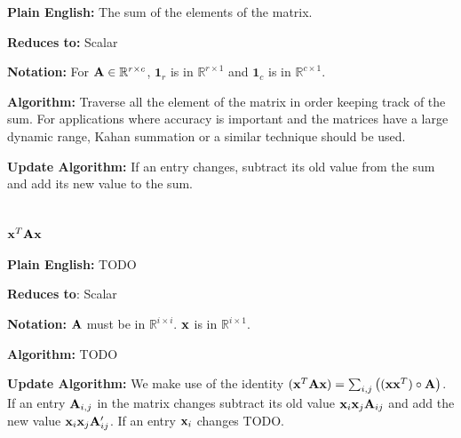 \textbf{Plain English:} The sum of the elements of the matrix.

\textbf{Reduces to:} Scalar

\textbf{Notation:} For $\mathbf{A} \in \mathbb{R}^{r\times c}$, $\mathbf{1}_r$ is in $\mathbb{R}^{r \times 1}$ and $\mathbf{1}_c$ is in $\mathbb{R}^{c \times 1}$.

\textbf{Algorithm:} Traverse all the element of the matrix in order keeping track of the sum. For applications where accuracy is important and the matrices have a large dynamic range, Kahan summation or a similar technique should be used.

\textbf{Update Algorithm:} If an entry changes, subtract its old value from the sum and add its new value to the sum.



\section{$\mathbf{x}^T \mathbf{A} \mathbf{x}$}

\textbf{Plain English:} TODO

\textbf{Reduces to}: Scalar

\textbf{Notation:} $\mathbf{A}$ must be in $\mathbb{R}^{i\times i}$. $\mathbf{x}$ is in $\mathbb{R}^{i \times 1}$.

\textbf{Algorithm:} TODO

\textbf{Update Algorithm:} We make use of the identity $(\mathbf{x}^T \mathbf{A} \mathbf{x})=\sum_{i,j}\big((\mathbf{x} \mathbf{x}^T)\circ\mathbf{A}\big)$. If an entry $\mathbf{A}_{i,j}$ in the matrix changes subtract its old value $\mathbf{x}_i \mathbf{x}_j \mathbf{A}_{ij}$ and add the new value $\mathbf{x}_i \mathbf{x}_j \mathbf{A}_{ij}'$. If an entry $\mathbf{x}_i$ changes TODO.
